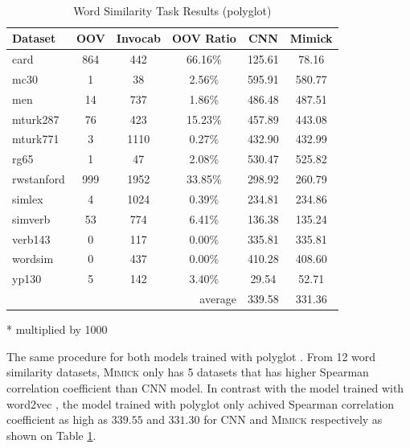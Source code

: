     \begin{table}[!ht]
      \begin{threeparttable} 
      \begin{center}
        \caption{Word Similarity Task Results (polyglot)}
        ~\\
        \label{tab:wordsim:polyglot}
        \begin{tabular}{l|c|c|c|c|c}
          \textbf{Dataset} & \textbf{OOV} & \textbf{Invocab} & \textbf{OOV Ratio} & \textbf{CNN}\tnote{*} & \textbf{Mimick}\tnote{*}\\
          \hline
          card & 864 & 442 & 66.16\% & 125.61 & 78.16\\
          mc30 & 1 & 38 & 2.56\% & 595.91 & 580.77\\
          men & 14 & 737 & 1.86\% & 486.48 & 487.51\\
          mturk287 & 76 & 423 & 15.23\% & 457.89 & 443.08\\
          mturk771 & 3 & 1110 & 0.27\% & 432.90 & 432.99\\
          rg65 & 1 & 47 & 2.08\% & 530.47 & 525.82\\
          rwstanford & 999 & 1952 & 33.85\% & 298.92 & 260.79\\
          simlex & 4 & 1024 & 0.39\% & 234.81 & 234.86\\
          simverb & 53 & 774 & 6.41\% & 136.38 & 135.24\\
          verb143 & 0 & 117 & 0.00\% & 335.81 & 335.81\\
          wordsim & 0 & 437 & 0.00\% & 410.28 & 408.60\\
          yp130 & 5 & 142 & 3.40\% & 29.54 & 52.71\\
          \hline
          \multicolumn{4}{r|}{average} & 339.58 & 331.36\\
        \end{tabular}
        \begin{tablenotes}
          \item[*] multiplied by 1000
        \end{tablenotes}
      \end{center}
    \end{threeparttable} 
    \end{table}

    The same procedure for both models trained with polyglot
    \citep{polyglot2013alrfou}. From 12 word similarity datasets,
    \textsc{Mimick} only has 5 datasets that has higher Spearman
    correlation coefficient than CNN model. In contrast with the model
    trained with word2vec \citep{Distributed2013mikolov}, the model
    trained with polyglot \citep{polyglot2013alrfou} only achived
    Spearman correlation coefficient as high as $339.55$ and $331.30$
    for CNN and \textsc{Mimick} respectively as shown on Table
    \ref{tab:wordsim:polyglot}.


